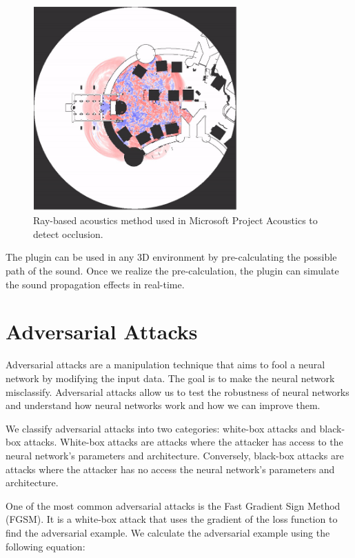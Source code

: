 \begin{figure}[H]
    \centering
    \includegraphics[width=0.7\textwidth]{../Images/microsoft_ray_based_acoustics.png}
    \caption{Ray-based acoustics method used in Microsoft Project Acoustics to detect occlusion\cite{rosen2020interactive}.}
    \label{fig:microsoft_ray_based_acoustics}
\end{figure}

The plugin can be used in any 3D environment by pre-calculating the possible path of the sound. Once we realize the pre-calculation, the plugin can simulate the sound propagation effects in real-time.

\section{Adversarial Attacks}
\label{sec:adversarial_attacks}

Adversarial attacks are a manipulation technique that aims to fool a neural network by modifying the input data. The goal is to make the neural network misclassify. Adversarial attacks allow us to test the robustness of neural networks and understand how neural networks work and how we can improve them.

We classify adversarial attacks into two categories: white-box attacks and black-box attacks. White-box attacks are attacks where the attacker has access to the neural network's parameters and architecture. Conversely, black-box attacks are attacks where the attacker has no access the neural network's parameters and architecture.

One of the most common adversarial attacks is the Fast Gradient Sign Method (FGSM)\cite{goodfellow2015explaining}. It is a white-box attack that uses the gradient of the loss function to find the adversarial example. We calculate the adversarial example using the following equation:


